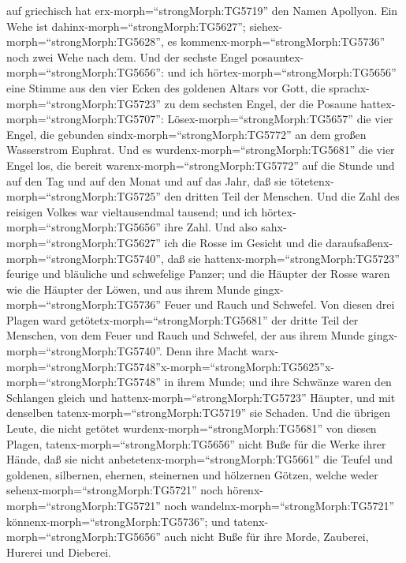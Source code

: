 auf griechisch hat erx-morph=``strongMorph:TG5719'' den Namen Apollyon.
 Ein Wehe ist dahinx-morph=``strongMorph:TG5627'';
siehex-morph=``strongMorph:TG5628'', es
kommenx-morph=``strongMorph:TG5736'' noch zwei Wehe nach dem.
 Und der sechste Engel
posauntex-morph=``strongMorph:TG5656'': und ich
hörtex-morph=``strongMorph:TG5656'' eine Stimme aus den vier Ecken des
goldenen Altars vor Gott,  die
sprachx-morph=``strongMorph:TG5723'' zu dem sechsten Engel, der die
Posaune hattex-morph=``strongMorph:TG5707'':
Lösex-morph=``strongMorph:TG5657'' die vier Engel, die gebunden
sindx-morph=``strongMorph:TG5772'' an dem großen Wasserstrom Euphrat.
 Und es wurdenx-morph=``strongMorph:TG5681'' die vier Engel
los, die bereit warenx-morph=``strongMorph:TG5772'' auf die Stunde und
auf den Tag und auf den Monat und auf das Jahr, daß sie
tötetenx-morph=``strongMorph:TG5725'' den dritten Teil der Menschen.
 Und die Zahl des reisigen Volkes war vieltausendmal
tausend; und ich hörtex-morph=``strongMorph:TG5656'' ihre Zahl.
 Und also sahx-morph=``strongMorph:TG5627'' ich die Rosse
im Gesicht und die daraufsaßenx-morph=``strongMorph:TG5740'', daß sie
hattenx-morph=``strongMorph:TG5723'' feurige und bläuliche und
schwefelige Panzer; und die Häupter der Rosse waren wie die Häupter der
Löwen, und aus ihrem Munde gingx-morph=``strongMorph:TG5736'' Feuer und
Rauch und Schwefel.  Von diesen drei Plagen ward
getötetx-morph=``strongMorph:TG5681'' der dritte Teil der Menschen, von
dem Feuer und Rauch und Schwefel, der aus ihrem Munde
gingx-morph=``strongMorph:TG5740''.  Denn ihre Macht
warx-morph=``strongMorph:TG5748''\textbar x-morph=``strongMorph:TG5625''x-morph=``strongMorph:TG5748''
in ihrem Munde; und ihre Schwänze waren den Schlangen gleich und
hattenx-morph=``strongMorph:TG5723'' Häupter, und mit denselben
tatenx-morph=``strongMorph:TG5719'' sie Schaden.  Und die
übrigen Leute, die nicht getötet wurdenx-morph=``strongMorph:TG5681''
von diesen Plagen, tatenx-morph=``strongMorph:TG5656'' nicht Buße für
die Werke ihrer Hände, daß sie nicht
anbetetenx-morph=``strongMorph:TG5661'' die Teufel und goldenen,
silbernen, ehernen, steinernen und hölzernen Götzen, welche weder
sehenx-morph=``strongMorph:TG5721'' noch
hörenx-morph=``strongMorph:TG5721'' noch
wandelnx-morph=``strongMorph:TG5721''
könnenx-morph=``strongMorph:TG5736'';  und
tatenx-morph=``strongMorph:TG5656'' auch nicht Buße für ihre Morde,
Zauberei, Hurerei und Dieberei.

